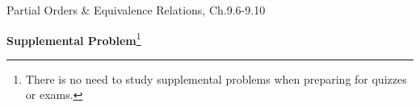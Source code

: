 \documentclass[handout]{mcs}
\begin{document}

\begin{staffnotes}
Partial Orders \& Equivalence Relations, Ch.9.6-9.10
\end{staffnotes}







\begin{center}
\textbf{Supplemental Problem}\footnote{There is no need to study supplemental
  problems when preparing for quizzes or exams.}
\end{center}



\end{document}
